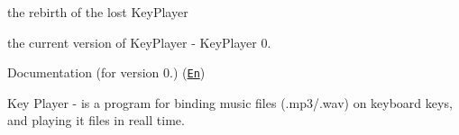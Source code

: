 the rebirth of the lost Key\+Player

the current version of Key\+Player -\/ Key\+Player 0.

Documentation (for version 0.) (\href{https://fyodorovaleksej.github.io/KeyPlayer/}{\tt En})

Key Player -\/ is a program for binding music files (.mp3/.wav) on keyboard keys, and playing it files in reall time. 